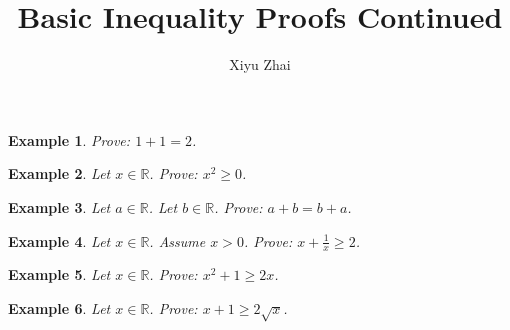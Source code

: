 \documentclass{article}
\newtheorem{example}{Example}
\begin{document}
\title{Basic Inequality Proofs Continued}
\author{Xiyu Zhai}
\maketitle

\begin{example}
    Prove: $1+1=2$.
\end{example}


\begin{example}
    Let $x\in\mathbb{R}$. Prove: $x^2\ge 0$.
\end{example}

\begin{example}
    Let $a\in\mathbb{R}$. Let $b\in\mathbb{R}$. Prove: $a+b=b+a$.
\end{example}

\begin{example}
    Let $x\in\mathbb{R}$. Assume $x> 0$. Prove: $x + \frac{1}{x} \ge 2$.
\end{example}

\begin{example}
    Let $x\in\mathbb{R}$. Prove: $x^2 + 1\ge 2x$.
\end{example}

\begin{example}
    Let $x\in\mathbb{R}$. Prove: $x + 1 \ge 2\sqrt{x}$.
\end{example}
\end{document}
